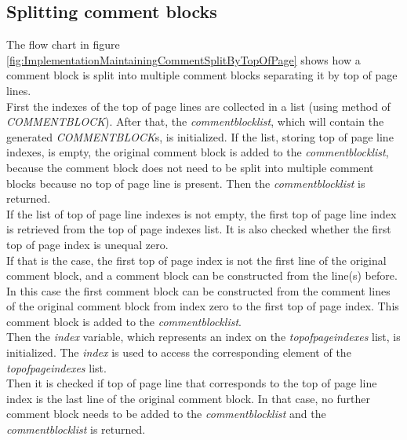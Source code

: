 \subsection{Splitting comment blocks}\label{sec:ImplementationMaintainingCommentsSplitByTop}

The flow chart in figure \ref{fig:ImplementationMaintainingCommentSplitByTopOfPage} shows how a comment block is split into multiple comment blocks separating it by top of page lines.\\
First the indexes of the top of page lines are collected in a list (using method of \textit{COMMENT\textunderscore BLOCK}).
After that, the \textit{comment\textunderscore block\textunderscore list}, which will contain the generated \textit{COMMENT\textunderscore BLOCK}s, is initialized.
If the list, storing top of page line indexes, is empty, the original comment block is added to the \textit{comment\textunderscore block\textunderscore list}, because the comment block does not need to be split into multiple comment blocks because no top of page line is present.
Then the \textit{comment\textunderscore block\textunderscore list} is returned.\\
If the list of top of page line indexes is not empty, the first top of page line index is retrieved from the top of page indexes list.
It is also checked whether the first top of page index is unequal zero.\\
If that is the case, the first top of page index is not the first line of the original comment block, and a comment block can be constructed from the line(s) before.
In this case the first comment block can be constructed from the comment lines of the original comment block from index zero to the first top of page index.
This comment block is added to the \textit{comment\textunderscore block\textunderscore list}.\\
Then the \textit{index} variable, which represents an index on the \textit{top\textunderscore of\textunderscore page\textunderscore indexes} list, is initialized.
The \textit{index} is used to access the corresponding element of the \textit{top\textunderscore of\textunderscore page\textunderscore indexes} list.\\
Then it is checked if top of page line that corresponds to the top of page line index is the last line of the original comment block.
In that case, no further comment block needs to be added to the \textit{comment\textunderscore block\textunderscore list} and the \textit{comment\textunderscore block\textunderscore list} is returned.\\
